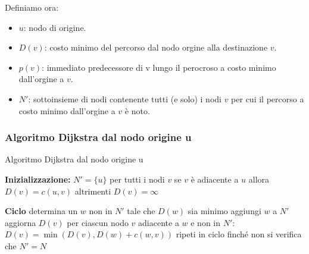 Definiamo ora:
\begin{itemize}
  \item $u$: nodo di origine.
  \item $D(v)$: costo minimo del percorso dal nodo orgine alla destinazione $v$. 
  \item $p(v)$: immediato predecessore di v lungo il perocroso a costo minimo dall'orgine a $v$. 
  \item $N'$: sottoinsieme di nodi contenente tutti (e solo) i nodi $v$ per cui il percorso a costo minimo dall'orgine a $v$ è noto. 
\end{itemize}

\subsubsection*{Algoritmo Dijkstra dal nodo origine u}
\begin{algorithm}[H]
\caption{Algoritmo Dijkstra dal nodo origine u}
\begin{algorithmic}[1]
\STATE \textbf{Inizializzazione:}
\STATE \hspace{0.5cm}$N' = \{u\}$
\STATE \hspace{0.5cm}per tutti i nodi $v$
\STATE \hspace{1cm}se $v$ è adiacente a $u$
\STATE \hspace{1.5cm}allora $D(v) = c(u,v)$
\STATE \hspace{1cm}altrimenti $D(v) = \infty$

\STATE \textbf{Ciclo}
\STATE \hspace{0.5cm}determina un $w$ non in $N'$ tale che $D(w)$ sia minimo
\STATE \hspace{0.5cm}aggiungi $w$ a $N'$
\STATE \hspace{0.5cm}aggiorna $D(v)$ per ciascun nodo $v$ adiacente a $w$ e non in $N'$:
\STATE \hspace{1cm}$D(v) = \min(D(v), D(w) + c(w,v))$
\STATE \hspace{1cm}
\STATE \hspace{1cm}
\STATE \hspace{0.5cm}ripeti in ciclo finché non si verifica che $N' = N$
\end{algorithmic}
\end{algorithm}


